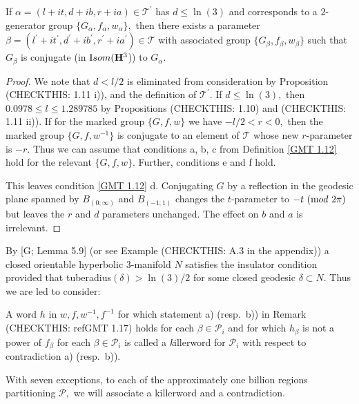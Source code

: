 \begin{lemma}\label{GMT 1.13}
If $\alpha=(l+it, d+ib, r+ia)\in {\mathcal T}^{\prime}$ has $d\le \ln(3)$ and
corresponds to a $2$\/{\textrm -}\/generator group
$\{G_\alpha,f_\alpha,w_\alpha\},$ then there exists a parameter $\beta=(l^{\prime}+it^{\prime}, d^{\prime}+ib^{\prime}, r^{\prime}+ia^{\prime})\in {\mathcal T}$ 
with associated group $\{G_\beta,f_\beta, w_\beta\}$ such that $G_\beta$ is conjugate (in ${\textrm Isom}({\mathbf H}^3$)) to $G_\alpha.$ 
\end{lemma}

\begin{proof} We note that $d < l/2$ is eliminated from consideration by Proposition (CHECKTHIS: 1.11 i)), and the definition of ${\mathcal T}^\prime.$ If $d\le \ln(3),$
then
$0.0978\le l\le 1.289785$ by Propositions (CHECKTHIS: 1.10) and (CHECKTHIS: 1.11 ii)).  If for the marked group $\{G, f, w\}$ we have 
$-l/2<r<0,$ then the marked group
$\{G,f,w^{-1}\}$ is conjugate to an element of ${\mathcal T}$ whose new
$r$-parameter is $-r.$  Thus we can assume that
conditions a, b, c from Definition \ref{GMT 1.12} hold for the relevant $\{G,f,w\}.$  Further,    conditions e and f hold.

This leaves condition \ref{GMT 1.12} d.  Conjugating $G$ by a
reflection in the geodesic plane spanned
by $B_{(0;\infty)}$ and $B_{(-1;1)}$ changes the $t$-parameter to 
$-t \ ({\textrm mod}\ 2\pi)$
but leaves the $r$ and $d$ parameters unchanged.
The effect on $b$ and $a$ is irrelevant.  \end{proof}

By [G; Lemma 5.9] (or see Example (CHECKTHIS: A.3 in the appendix)) a closed orientable hyperbolic $3$-manifold $N$
satisfies the insulator condition provided that
tuberadius$(\delta) > \ln(3)/2$ for some closed geodesic $\delta\subset N.$  Thus we
are led to consider:


\begin{definition}  \label{GMT 1.18} A word $h$ in $w,f,w^{-1},f^{-1}$ for which statement a) (resp.\ b)) in Remark 
(CHECKTHIS: ref{GMT 1.17}) holds for each $\beta\in {\mathcal P}_i$
and for which $h_\beta$ is not a power of $f_\beta$ for each $\beta\in {\mathcal P}_i$ is
called a {\textit killerword} for ${\mathcal P}_i$ with respect to contradiction a) (resp.\ b)).
\end{definition}

\begin{summary}  \label{GMT 1.19} With seven exceptions,  to each of the approximately one
billion regions partitioning ${\mathcal P},$ we will
associate a killerword and a contradiction.  \end{summary} 

